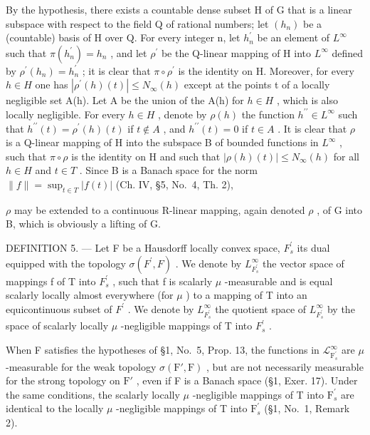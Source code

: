 By the hypothesis, there exists a countable dense subset H of G that is a linear subspace with respect to the field Q of rational numbers; let \((h_{n})\) be a (countable) basis of H over Q. For every integer n, let \(h_{n}^{\prime}\) be an element of \(L^{\infty}\) such that \(\pi(h_{n}^{\prime}) = h_{n}\) , and let \(\rho^{\prime}\) be the Q-linear mapping of H into \(L^{\infty}\) defined by \(\rho^{\prime}(h_{n}) = h_{n}^{\prime}\) ; it is clear that \(\pi \circ \rho^{\prime}\) is the identity on H. Moreover, for every \(h \in H\) one has \(|\rho^{\prime}(h)(t)| \leqslant N_{\infty}(h)\) except at the points t of a locally negligible set A(h). Let A be the union of the A(h) for \(h \in H\) , which is also locally negligible. For every \(h \in H\) , denote by \(\rho(h)\) the function \(h^{\prime\prime} \in L^{\infty}\) such that \(h^{\prime\prime}(t) = \rho^{\prime}(h)(t)\) if \(t \notin A\) , and \(h^{\prime\prime}(t) = 0\) if \(t \in A\) . It is clear that \(\rho\) is a Q-linear mapping of H into the subspace B of bounded functions in \(L^{\infty}\) , such that \(\pi \circ \rho\) is the identity on H and such that \(|\rho(h)(t)| \leqslant N_{\infty}(h)\) for all \(h \in H\) and \(t \in T\) . Since B is a Banach space for the norm \(\|f\| = \sup_{t \in T} |f(t)|\) (Ch. IV, §5, No.~4, Th. 2),

\(\rho\) may be extended to a continuous R-linear mapping, again denoted \(\rho\) , of G into B, which is obviously a lifting of G.

DEFINITION 5. --- Let F be a Hausdorff locally convex space, \(F_{s}^{\prime}\) its dual equipped with the topology \(\sigma(F^{\prime},F)\) . We denote by \(L_{F_{s}^{\prime}}^{\infty}\) the vector space of mappings f of T into \(F_{s}^{\prime}\) , such that f is scalarly \(\mu\) -measurable and is equal scalarly locally almost everywhere (for \(\mu\) ) to a mapping of T into an equicontinuous subset of \(F^{\prime}\) . We denote by \(L_{F_{s}^{\prime}}^{\infty}\) the quotient space of \(L_{F_{s}^{\prime}}^{\infty}\) by the space of scalarly locally \(\mu\) -negligible mappings of T into \(F_{s}^{\prime}\) .

When F satisfies the hypotheses of §1, No.~5, Prop. 13, the functions in \(\mathcal{L}_{\mathrm{F}_s^\prime}^\infty\) are \(\mu\) -measurable for the weak topology \(\sigma(\mathrm{F}',\mathrm{F})\) , but are not necessarily measurable for the strong topology on \(\mathrm{F}'\) , even if F is a Banach space (§1, Exer. 17). Under the same conditions, the scalarly locally \(\mu\) -negligible mappings of T into \(\mathrm{F}_s^\prime\) are identical to the locally \(\mu\) -negligible mappings of T into \(\mathrm{F}_s^\prime\) (§1, No.~1, Remark 2).


